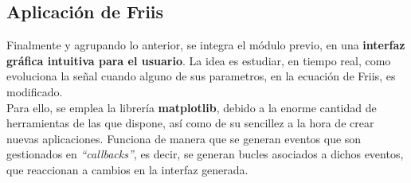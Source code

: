 



\subsection{Aplicación de Friis}
\label{subsec:friis-app}

Finalmente y agrupando lo anterior, se integra el módulo previo, en una \textbf{interfaz gráfica intuitiva para el usuario}. La idea es estudiar, en tiempo real, como evoluciona la señal cuando alguno de sus parametros, en la ecuación de Friis, es modificado.\\

Para ello, se emplea la librería \textbf{matplotlib}, debido a la enorme cantidad de herramientas de las que dispone, así como de su sencillez a la hora de crear nuevas aplicaciones. Funciona de manera que se generan eventos que son gestionados en \emph{``callbacks''}, es decir, se generan bucles asociados a dichos eventos, que reaccionan a cambios en la interfaz generada.\\

